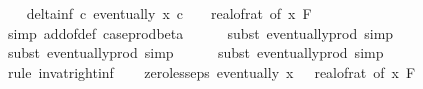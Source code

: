 \begin{isabellebody}
\isanewline
\ \ \isamarkupfalse%
\ delta{\isacharunderscore}{\kern0pt}inf{\isacharcolon}{\kern0pt}\ {\isachardoublequoteopen}{\isasymAnd}c{\isachardot}{\kern0pt}\ eventually\ {\isacharparenleft}{\kern0pt}{\isasymlambda}x{\isachardot}{\kern0pt}\ c\ {\isasymle}\ {}\ {\isacharslash}{\kern0pt}\ {\isacharparenleft}{\kern0pt}real{\isacharunderscore}{\kern0pt}of{\isacharunderscore}{\kern0pt}rat\ {\isacharparenleft}{\kern0pt}{\isasymdelta}{\isacharunderscore}{\kern0pt}of\ x{\isacharparenright}{\kern0pt}{\isacharparenright}{\kern0pt}{\isacharparenright}{\kern0pt}\ {\isacharquery}{\kern0pt}F{\isachardoublequoteclose}\isanewline
\ \ \ \ \isamarkupfalse%
\ {\isacharparenleft}{\kern0pt}simp\ add{\isacharcolon}{\kern0pt}{\isasymdelta}{\isacharunderscore}{\kern0pt}of{\isacharunderscore}{\kern0pt}def\ case{\isacharunderscore}{\kern0pt}prod{\isacharunderscore}{\kern0pt}beta{\isacharprime}{\kern0pt}{\isacharparenright}{\kern0pt}\isanewline
\ \ \ \ \isamarkupfalse%
\ {\isacharparenleft}{\kern0pt}subst\ eventually{\isacharunderscore}{\kern0pt}prod{}{\isacharprime}{\kern0pt}{\isacharcomma}{\kern0pt}\ simp{\isacharparenright}{\kern0pt}\isanewline
\ \ \ \ \isamarkupfalse%
\ {\isacharparenleft}{\kern0pt}subst\ eventually{\isacharunderscore}{\kern0pt}prod{}{\isacharprime}{\kern0pt}{\isacharcomma}{\kern0pt}\ simp{\isacharparenright}{\kern0pt}\isanewline
\ \ \ \ \isamarkupfalse%
\ {\isacharparenleft}{\kern0pt}subst\ eventually{\isacharunderscore}{\kern0pt}prod{}{\isacharprime}{\kern0pt}{\isacharcomma}{\kern0pt}\ simp{\isacharparenright}{\kern0pt}\isanewline
\ \ \ \ \isamarkupfalse%
\ {\isacharparenleft}{\kern0pt}rule\ inv{\isacharunderscore}{\kern0pt}at{\isacharunderscore}{\kern0pt}right{\isacharunderscore}{\kern0pt}{}{\isacharunderscore}{\kern0pt}inf{\isacharparenright}{\kern0pt}\isanewline
\isanewline
\ \ \isamarkupfalse%
\ zero{\isacharunderscore}{\kern0pt}less{\isacharunderscore}{\kern0pt}eps{\isacharcolon}{\kern0pt}\ {\isachardoublequoteopen}eventually\ {\isacharparenleft}{\kern0pt}{\isasymlambda}x{\isachardot}{\kern0pt}\ {}\ {\isacharless}{\kern0pt}\ {\isacharparenleft}{\kern0pt}real{\isacharunderscore}{\kern0pt}of{\isacharunderscore}{\kern0pt}rat\ {\isacharparenleft}{\kern0pt}{\isasymepsilon}{\isacharunderscore}{\kern0pt}of\ x{\isacharparenright}{\kern0pt}{\isacharparenright}{\kern0pt}{\isacharparenright}{\kern0pt}\ {\isacharquery}{\kern0pt}F{\isachardoublequoteclose}\isanewline
\ \ \ \ \isamarkupfalse%

\end{isabellebody}
